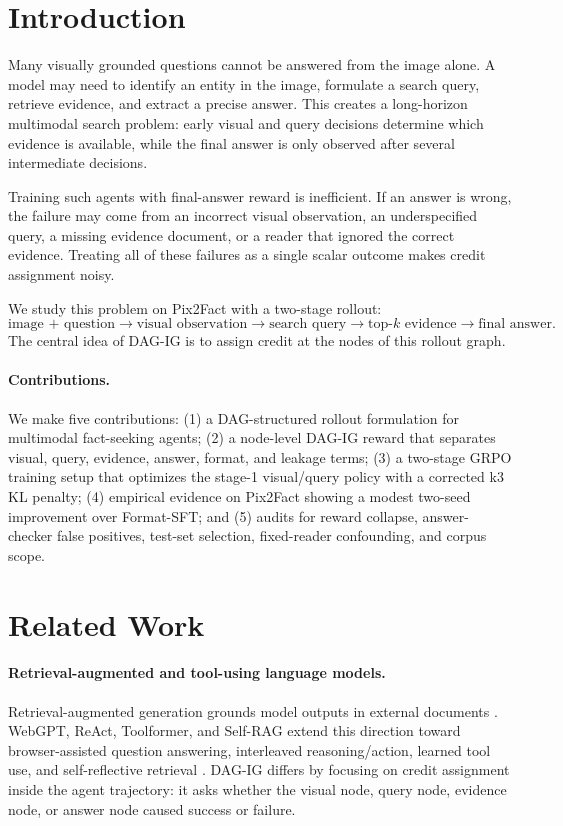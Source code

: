 \section{Introduction}

Many visually grounded questions cannot be answered from the image alone. A model may need to identify an entity in the image, formulate a search query, retrieve evidence, and extract a precise answer. This creates a long-horizon multimodal search problem: early visual and query decisions determine which evidence is available, while the final answer is only observed after several intermediate decisions.

Training such agents with final-answer reward is inefficient. If an answer is wrong, the failure may come from an incorrect visual observation, an underspecified query, a missing evidence document, or a reader that ignored the correct evidence. Treating all of these failures as a single scalar outcome makes credit assignment noisy.

We study this problem on Pix2Fact with a two-stage rollout:
\[
\text{image + question} \rightarrow \text{visual observation} \rightarrow \text{search query} \rightarrow \text{top-}k\text{ evidence} \rightarrow \text{final answer}.
\]
The central idea of DAG-IG is to assign credit at the nodes of this rollout graph.

\paragraph{Contributions.}
We make five contributions: (1) a DAG-structured rollout formulation for multimodal fact-seeking agents; (2) a node-level DAG-IG reward that separates visual, query, evidence, answer, format, and leakage terms; (3) a two-stage GRPO training setup that optimizes the stage-1 visual/query policy with a corrected k3 KL penalty; (4) empirical evidence on Pix2Fact showing a modest two-seed improvement over Format-SFT; and (5) audits for reward collapse, answer-checker false positives, test-set selection, fixed-reader confounding, and corpus scope.

\section{Related Work}

\paragraph{Retrieval-augmented and tool-using language models.}
Retrieval-augmented generation grounds model outputs in external documents \cite{lewis2020rag}. WebGPT, ReAct, Toolformer, and Self-RAG extend this direction toward browser-assisted question answering, interleaved reasoning/action, learned tool use, and self-reflective retrieval \cite{nakano2021webgpt,yao2023react,schick2023toolformer,asai2023selfrag}. DAG-IG differs by focusing on credit assignment inside the agent trajectory: it asks whether the visual node, query node, evidence node, or answer node caused success or failure.

